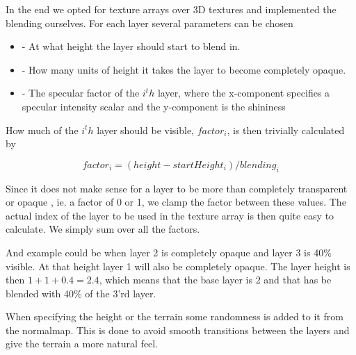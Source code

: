In the end we opted for texture arrays over 3D textures and
implemented the blending ourselves. For each layer several parameters
can be chosen

\newcommand{\layerProp}[2]{\item \code{#1} - #2}
\begin{itemize}
  \layerProp{startHeight}{At what height the layer should start to
    blend in.}
  \layerProp{blending}{How many units of height it takes the layer to
    become completely opaque.}
  \layerProp{spec[i]}{The specular factor of the $i^th$ layer, where the
    x-component specifies a specular intensity scalar and the
    y-component is the shininess}
\end{itemize}

How much of the $i^th$ layer should be visible, $factor_i$, is then
trivially calculated by

\begin{displaymath}
  factor_i = (height - startHeight_i) / blending_i
\end{displaymath}

Since it does not make sense for a layer to be more than completely
transparent or opaque , ie. a factor of 0 or 1, we clamp the factor
between these values. The actual index of the layer to be used in the
texture array is then quite easy to calculate. We simply sum over all
the factors.

And example could be when layer 2 is completely opaque and layer 3 is
40\% visible. At that height layer 1 will also be completely
opaque. The layer height is then $1 + 1 + 0.4 = 2.4$, which means that
the base layer is 2 and that has be blended with 40\% of the 3'rd
layer.

When specifying the height or the terrain some randomness is added to
it from the normalmap. This is done to avoid smooth transitions
between the layers and give the terrain a more natural feel.


